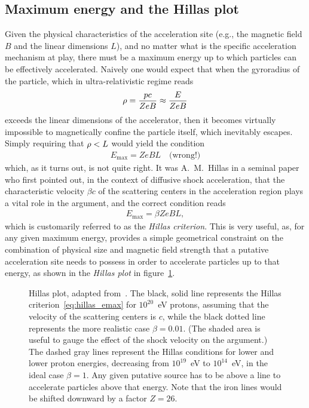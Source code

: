 \subsection{Maximum energy and the Hillas plot}

Given the physical characteristics of the acceleration site (e.g., the magnetic
field $B$ and the linear dimensions $L$), and no matter what is the specific acceleration
mechanism at play, there must be a maximum energy up to which particles can be
effectively accelerated. Naively one would expect that when the gyroradius of the
particle, which in ultra-relativistic regime reads
\begin{align*}
  \rho = \frac{pc}{ZeB} \approx \frac{E}{ZeB}
\end{align*}
exceeds the linear dimensions of the accelerator, then it becomes virtually impossible
to magnetically confine the particle itself, which inevitably escapes. Simply requiring
that $\rho < L$ would yield the condition
\begin{align*}
  E_\text{max} = ZeBL \quad\text{(wrong!)}
\end{align*}
which, as it turns out, is not quite right. It was A.~M.~Hillas in a seminal paper~\cite{1984ARA&A..22..425H} who first pointed out, in the context of diffusive
shock acceleration, that the characteristic velocity $\beta c$ of the scattering
centers in the acceleration region plays a vital role in the argument, and the
correct condition reads
\begin{align}\label{eq:hillas_emax}
  E_\text{max} = \beta ZeBL,
\end{align}
which is customarily referred to as the \emph{Hillas criterion}. This is very useful,
as, for any given maximum energy, provides a simple geometrical constraint on the
combination of physical size and magnetic field strength that a putative acceleration
site needs to possess in order to accelerate particles up to that energy, as shown
in the \emph{Hillas plot} in figure~\ref{fig:hillas_plot}.

\begin{figure}[!htbp]
  
  \caption{Hillas plot, adapted from~\cite{1984ARA&A..22..425H}. The black, solid
  line represents the Hillas criterion~\eqref{eq:hillas_emax} for $10^{20}$~eV protons,
  assuming that the velocity of the scattering centers is $c$, while the black dotted
  line represents the more realistic case $\beta = 0.01$. (The shaded area is useful
  to gauge the effect of the shock velocity on the argument.) The dashed gray lines
  represent the Hillas conditions for lower and lower proton energies, decreasing from
  $10^{19}$~eV to $10^{14}$~eV, in the ideal case $\beta = 1$. Any given putative
  source has to be above a line to accelerate particles above that energy. Note
  that the iron lines would be shifted downward by a factor $Z = 26$.}
  \label{fig:hillas_plot}
\end{figure}

